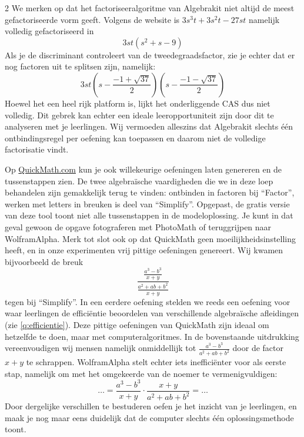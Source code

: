 \begin{multicols} {2}
    We merken op dat het factoriseeralgoritme van Algebrakit niet altijd de meest gefactoriseerde vorm geeft.
    Volgens de website is \(3s^3t+3s^2t-27st\) namelijk volledig gefactoriseerd in 
    \[
    3st\left(s^2+s-9\right)
    \]
    Als je de discriminant controleert van de tweedegraadsfactor, zie je echter dat er nog factoren uit te splitsen zijn, namelijk:
    \[
    3st\left(s-\frac{-1+\sqrt{37}}{2}\right)\left(s-\frac{-1-\sqrt{37}}{2}\right)
    \]
    Hoewel het een heel rijk platform is, lijkt het onderliggende CAS dus niet volledig.
    Dit gebrek kan echter een ideale leeropportuniteit zijn door dit te analyseren met je leerlingen.    
    Wij vermoeden alleszins dat Algebrakit slechts één ontbindingsregel per oefening kan toepassen en daarom niet de volledige factorisatie vindt.
    
    Op \href{https://quickmath.com/webMathematica3/quickmath/algebra/simplify/basic.jsp}{QuickMath.com} kun je ook willekeurige oefeningen laten genereren en de tussenstappen zien.
    De twee algebraïsche vaardigheden die we in deze loep behandelen zijn gemakkelijk terug te vinden: ontbinden in factoren bij ``Factor'', werken met letters in breuken is deel van ``Simplify''.
    Opgepast, de gratis versie van deze tool toont niet alle tussenstappen in de modeloplossing.
    Je kunt in dat geval gewoon de opgave fotograferen met PhotoMath of teruggrijpen naar WolframAlpha.
    Merk tot slot ook op dat QuickMath geen moeilijkheidsinstelling heeft, en in onze experimenten vrij pittige oefeningen genereert.
    Wij kwamen bijvoorbeeld de breuk
    \[
    \frac{\frac{a^3 - b^3}{x + y}}{\frac{a^2 + a b + b^2}{x + y}}
    \]
    tegen bij ``Simplify''.
    In een eerdere oefening stelden we reeds een oefening voor waar leerlingen de efficiëntie beoordelen van verschillende algebraïsche afleidingen (zie \autoref{q:efficientie}).
    Deze pittige oefeningen van QuickMath zijn ideaal om hetzelfde te doen, maar met computeralgoritmes.
    In de bovenstaande uitdrukking vereenvoudigen wij mensen namelijk onmiddellijk tot \(\frac{a^3-b^3}{a^2 + a b + b^2}\) door de factor \(x+y\) te schrappen.
    WolframAlpha stelt echter iets inefficiënter voor als eerste stap, namelijk om met het omgekeerde van de noemer te vermenigvuldigen:
    \[
    \ldots = \frac{a^3 - b^3}{x + y}\cdot\frac{x+y}{a^2 + a b + b^2} = \ldots
    \]
    Door dergelijke verschillen te bestuderen oefen je het inzicht van je leerlingen, en maak je nog maar eens duidelijk dat de computer slechts één oplossingsmethode toont.


\end{multicols}
